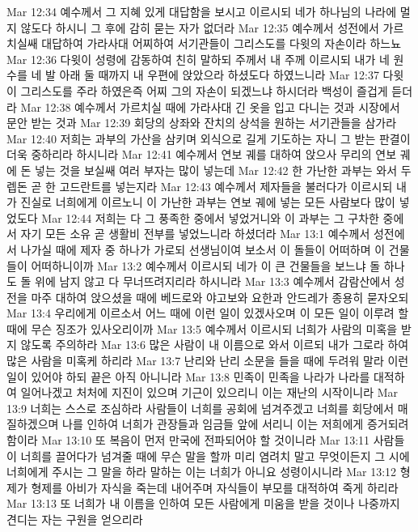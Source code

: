 Mar 12:34  예수께서 그 지혜 있게 대답함을 보시고 이르시되 네가 하나님의 나라에 멀지 않도다 하시니 그 후에 감히 묻는 자가 없더라
Mar 12:35  예수께서 성전에서 가르치실쌔 대답하여 가라사대 어찌하여 서기관들이 그리스도를 다윗의 자손이라 하느뇨
Mar 12:36  다윗이 성령에 감동하여 친히 말하되 주께서 내 주께 이르시되 내가 네 원수를 네 발 아래 둘 때까지 내 우편에 앉았으라 하셨도다 하였느니라
Mar 12:37  다윗이 그리스도를 주라 하였은즉 어찌 그의 자손이 되겠느냐 하시더라 백성이 즐겁게 듣더라
Mar 12:38  예수께서 가르치실 때에 가라사대 긴 옷을 입고 다니는 것과 시장에서 문안 받는 것과
Mar 12:39  회당의 상좌와 잔치의 상석을 원하는 서기관들을 삼가라
Mar 12:40  저희는 과부의 가산을 삼키며 외식으로 길게 기도하는 자니 그 받는 판결이 더욱 중하리라 하시니라
Mar 12:41  예수께서 연보 궤를 대하여 앉으사 무리의 연보 궤에 돈 넣는 것을 보실쌔 여러 부자는 많이 넣는데
Mar 12:42  한 가난한 과부는 와서 두 렙돈 곧 한 고드란트를 넣는지라
Mar 12:43  예수께서 제자들을 불러다가 이르시되 내가 진실로 너희에게 이르노니 이 가난한 과부는 연보 궤에 넣는 모든 사람보다 많이 넣었도다
Mar 12:44  저희는 다 그 풍족한 중에서 넣었거니와 이 과부는 그 구차한 중에서 자기 모든 소유 곧 생활비 전부를 넣었느니라 하셨더라
Mar 13:1  예수께서 성전에서 나가실 때에 제자 중 하나가 가로되 선생님이여 보소서 이 돌들이 어떠하며 이 건물들이 어떠하니이까
Mar 13:2  예수께서 이르시되 네가 이 큰 건물들을 보느냐 돌 하나도 돌 위에 남지 않고 다 무너뜨려지리라 하시니라
Mar 13:3  예수께서 감람산에서 성전을 마주 대하여 앉으셨을 때에 베드로와 야고보와 요한과 안드레가 종용히 묻자오되
Mar 13:4  우리에게 이르소서 어느 때에 이런 일이 있겠사오며 이 모든 일이 이루려 할 때에 무슨 징조가 있사오리이까
Mar 13:5  예수께서 이르시되 너희가 사람의 미혹을 받지 않도록 주의하라
Mar 13:6  많은 사람이 내 이름으로 와서 이르되 내가 그로라 하여 많은 사람을 미혹케 하리라
Mar 13:7  난리와 난리 소문을 들을 때에 두려워 말라 이런 일이 있어야 하되 끝은 아직 아니니라
Mar 13:8  민족이 민족을 나라가 나라를 대적하여 일어나겠고 처처에 지진이 있으며 기근이 있으리니 이는 재난의 시작이니라
Mar 13:9  너희는 스스로 조심하라 사람들이 너희를 공회에 넘겨주겠고 너희를 회당에서 매질하겠으며 나를 인하여 너희가 관장들과 임금들 앞에 서리니 이는 저희에게 증거되려 함이라
Mar 13:10  또 복음이 먼저 만국에 전파되어야 할 것이니라
Mar 13:11  사람들이 너희를 끌어다가 넘겨줄 때에 무슨 말을 할까 미리 염려치 말고 무엇이든지 그 시에 너희에게 주시는 그 말을 하라 말하는 이는 너희가 아니요 성령이시니라
Mar 13:12  형제가 형제를 아비가 자식을 죽는데 내어주며 자식들이 부모를 대적하여 죽게 하리라
Mar 13:13  또 너희가 내 이름을 인하여 모든 사람에게 미움을 받을 것이나 나중까지 견디는 자는 구원을 얻으리라

